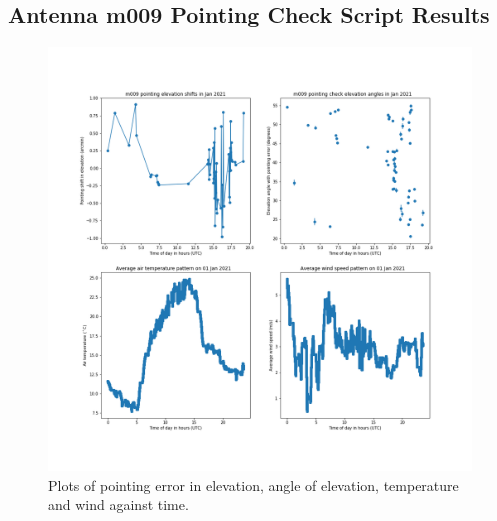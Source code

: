 \documentclass{article}
\begin{document}
\subsection{Antenna m009 Pointing Check Script Results  }
\begin{figure}[H]
	\includegraphics[scale=0.45]{m009_elev_Jan.png}
	
	\caption{Plots of pointing error in elevation, angle of elevation, temperature and wind against time.}
	\label{fig:m009ElevJan}
\end{figure}
\end{document}
